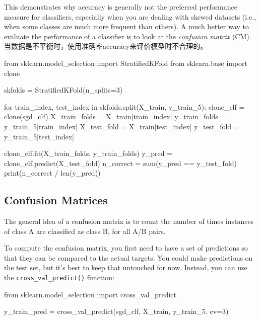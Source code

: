 This demonstrates why accuracy is generally not the preferred performance measure for classifiers, especially when you are dealing with skewed datasets (i.e., when some classes are much more frequent than others). A much better way to evaluate the performance of a classifier is to look at the \emph{confusion matrix} (CM). 当数据是不平衡时，使用准确率accuracy来评价模型时不合理的。

\begin{pyc}
    from sklearn.model_selection import StratifiedKFold
    from sklearn.base import clone

    skfolds = StratifiedKFold(n_splits=3)

    for train_index, test_index in skfolds.split(X_train, y_train_5):
    clone_clf = clone(sgd_clf)
    X_train_folds = X_train[train_index]
    y_train_folds = y_train_5[train_index]
    X_test_fold = X_train[test_index]
    y_test_fold = y_train_5[test_index]

    clone_clf.fit(X_train_folds, y_train_folds)
    y_pred = clone_clf.predict(X_test_fold)
    n_correct = sum(y_pred == y_test_fold)
    print(n_correct / len(y_pred))
\end{pyc}

\subsection{Confusion Matrices}
The general idea of a confusion matrix is to count the number of times instances of class A are classified as class B, for all A/B pairs.

To compute the confusion matrix, you first need to have a set of predictions so that they can be compared to the actual targets. You could make predictions on the test set, but it's best to keep that untouched for now. Instead, you can use the \verb|cross_val_predict()| function:
\begin{pyc}
    from sklearn.model_selection import cross_val_predict

    y_train_pred = cross_val_predict(sgd_clf, X_train, y_train_5, cv=3)
\end{pyc}

